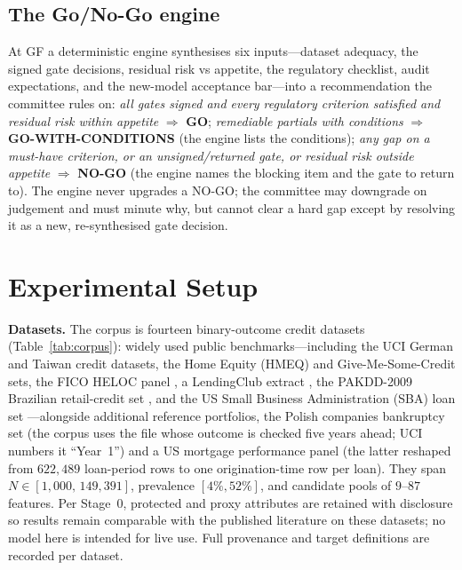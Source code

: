 \documentclass[9pt,journal]{IEEEtai}
\begin{document}
\subsection{The Go/No-Go engine}
At GF a deterministic engine synthesises six inputs---dataset adequacy, the signed gate
decisions, residual risk vs appetite, the regulatory checklist, audit expectations, and the
new-model acceptance bar---into a recommendation the committee rules on:
\emph{all gates signed and every regulatory criterion satisfied and residual risk within
appetite} $\Rightarrow$ \textbf{GO}; \emph{remediable partials with conditions} $\Rightarrow$
\textbf{GO-WITH-CONDITIONS} (the engine lists the conditions); \emph{any gap on a must-have
criterion, or an unsigned/returned gate, or residual risk outside appetite} $\Rightarrow$
\textbf{NO-GO} (the engine names the blocking item and the gate to return to). The engine never
upgrades a NO-GO; the committee may downgrade on judgement and must minute why, but cannot clear
a hard gap except by resolving it as a new, re-synthesised gate decision.

\section{Experimental Setup}\label{sec:setup}
\textbf{Datasets.} The corpus is fourteen binary-outcome credit datasets (Table~\ref{tab:corpus}):
widely used public benchmarks---including the UCI German \cite{groemping2019,uci2019} and Taiwan
\cite{yeh2009} credit datasets, the Home Equity (HMEQ) \cite{baesens2016} and Give-Me-Some-Credit
\cite{gmsc2011} sets, the FICO HELOC panel \cite{fico2018}, a LendingClub extract \cite{lendingclub},
the PAKDD-2009 Brazilian retail-credit set \cite{pakdd2009}, and the US Small Business
Administration (SBA) loan set \cite{li2018sba}---alongside additional reference portfolios, the Polish
companies bankruptcy set \cite{zieba2016} (the corpus uses the file whose outcome is checked five years ahead; UCI numbers it ``Year~1'') and a US mortgage performance panel \cite{baesens2016} (the latter
reshaped from $622{,}489$ loan-period rows to one origination-time row per loan). They span
$N\in[1{,}000,\,149{,}391]$, prevalence $[4\%,52\%]$, and candidate pools of $9$--$87$ features.
Per Stage~0, protected and proxy attributes are retained with disclosure so results remain
comparable with the published literature on these datasets; no model here is intended for live
use. Full provenance and target definitions are recorded per dataset.
\end{document}
